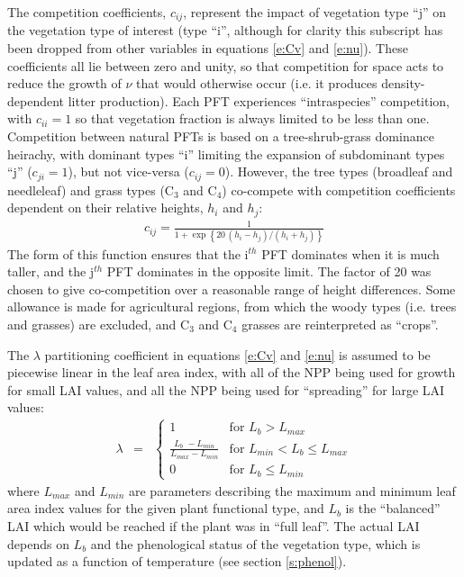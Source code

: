 \documentclass[a4paper]{article}
\begin{document}
The competition coefficients, $c_{ij}$, represent the impact of
vegetation type ``j'' on the vegetation type of interest (type ``i'',
although for clarity this subscript has been dropped from other
variables in equations \eqref{e:Cv} and \eqref{e:nu}). These
coefficients all lie between zero and unity, so that competition for
space acts to reduce the growth of $\nu$ that would otherwise occur
(i.e. it produces density-dependent litter production). Each PFT
experiences ``intraspecies'' competition, with $c_{ii}=1$ so that
vegetation fraction is always limited to be less than one. Competition
between natural PFTs is based on a tree-shrub-grass dominance
heirachy, with dominant types ``i'' limiting the expansion of
subdominant types ``j'' ($c_{ji}=1$), but not vice-versa ($c_{ij}=0$).
However, the tree types (broadleaf and needleleaf) and grass types
(C$_{3}$ and C$_{4}$) co-compete with competition coefficients
dependent on their relative heights, $h_{i}$ and $h_{j}$:
\begin{eqnarray}
c_{ij}=\frac{1}{1+\exp\left\{20 \, (h_{i}-h_{j})/(h_{i}+h_{j}) \right\}}
\label{e:cocomp}
\end{eqnarray}
The form of this function ensures that the i$^{th}$ PFT dominates when
it is much taller, and the j$^{th}$ PFT dominates in the opposite
limit. The factor of 20 was chosen to give co-competition over a
reasonable range of height differences. Some allowance is made for
agricultural regions, from which the woody types (i.e. trees and
grasses) are excluded, and C$_{3}$ and C$_{4}$ grasses are
reinterpreted as ``crops''.

The $\lambda$ partitioning coefficient in equations \eqref{e:Cv} and
\eqref{e:nu} is assumed to be piecewise linear in the leaf area index,
with all of the NPP being used for growth for small LAI values, and
all the NPP being used for ``spreading'' for large LAI values:
\begin{eqnarray}
\lambda &=& \left \{ \begin{array}{lll}
         1  & \mbox{for $L_b > L_{max}$}   \\ [5mm]
         \displaystyle{\frac{L_{b~~}-L_{min}}{L_{max}-L_{min}}}
     & \mbox{for $L_{min} < L_{b} \leq L_{max}$}  \\ [5mm]
              0 & \mbox{for $L_b \leq L_{min}$}
             \end{array} \right. 
\label{e:lambda}
\end{eqnarray} 
where $L_{max}$ and $L_{min}$ are parameters describing the maximum
and minimum leaf area index values for the given plant functional
type, and $L_b$ is the ``balanced'' LAI which would be reached if the
plant was in ``full leaf''. The actual LAI depends on $L_b$ and the
phenological status of the vegetation type, which is updated as a
function of temperature (see section \ref{s:phenol}).
\end{document}
